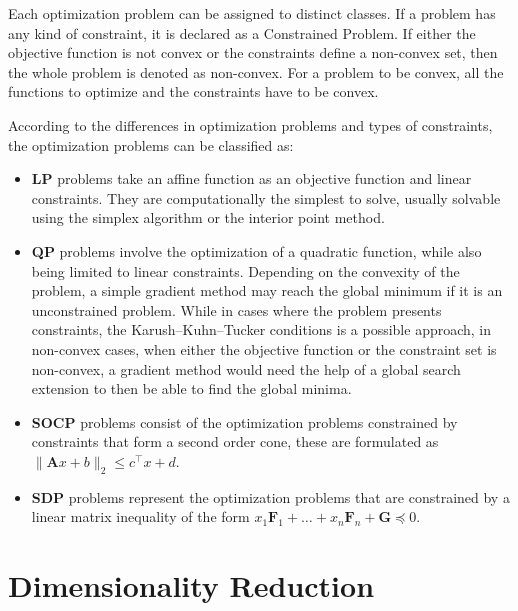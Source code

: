         Each optimization problem can be assigned to distinct classes.
        If a problem has any kind of constraint, it is declared as a Constrained Problem. If either the objective function is not convex or the constraints define a non-convex set, then the whole problem is denoted as non-convex. For a problem to be convex, all the functions to optimize and the constraints have to be convex.

        According to the differences in optimization problems and types of constraints, the optimization problems can be classified as:
        \begin{itemize}
            \item \textbf{\ac{LP}} problems take an affine function as an objective function and linear constraints. They are computationally the simplest to solve, usually solvable using the simplex algorithm or the interior point method.
            \item \textbf{\ac{QP}} problems involve the optimization of a quadratic function, while also being limited to linear constraints. Depending on the convexity of the problem, a simple gradient method may reach the global minimum if it is an unconstrained problem. While in cases where the problem presents constraints, the Karush–Kuhn–Tucker conditions is a possible approach, in non-convex cases, when either the objective function or the constraint set is non-convex, a gradient method would need the help of a global search extension to then be able to find the global minima.
            
            \item \textbf{\ac{SOCP}} problems consist of the optimization problems constrained by constraints that form a second order cone, these are formulated as $\| \boldsymbol{A}x+b \|_2 \le c^\top x +d$.

            \item \textbf{\ac{SDP}} problems represent the optimization problems that are constrained by a linear matrix inequality of the form $x_1\boldsymbol{F}_1 + \ldots + x_n\boldsymbol{F}_n + \boldsymbol{G} \preceq 0$.
            
        \end{itemize}

\section{Dimensionality Reduction}

